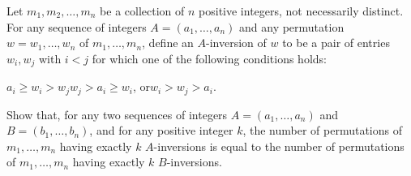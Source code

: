 Let $m_1, m_2, \ldots, m_n$ be a collection of $n$ positive integers, not necessarily distinct. For any sequence of integers $A = (a_1, \ldots, a_n)$ and any permutation $w = w_1, \ldots, w_n$ of $m_1, \ldots, m_n$,  define an $A$-inversion of $w$ to be a pair of entries $w_i, w_j$ with $i < j$ for which one of the following conditions holds:

$a_i \ge w_i > w_j$$w_j > a_i \ge w_i$,  or$w_i > w_j > a_i$.

Show that, for any two sequences of integers $A = (a_1, \ldots, a_n)$ and $B = (b_1, \ldots, b_n)$,  and for any positive integer $k$,  the number of permutations of $m_1, \ldots, m_n$ having exactly $k$ $A$-inversions is equal to the number of permutations of $m_1, \ldots, m_n$ having exactly $k$ $B$-inversions.